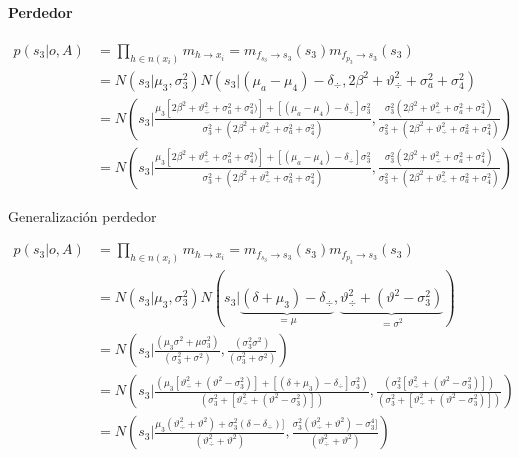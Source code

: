 \documentclass[11pt,twoside,spanish]{report} %
\begin{document}
\paragraph{Perdedor}
\begin{equation}
	\begin{split}
		p(s_3|o,A) &= \prod_{h \in n(x_i)} m_{h \rightarrow x_i} = m_{f_{s_3} \rightarrow s_3}(s_3) m_{f_{p_3} \rightarrow s_3}(s_3) \\
		&=  N(s_3| \mu_3, \sigma_3^2) N(s_3|(\mu_a - \mu_4) - \delta_{\div}, 2\beta^2+\vartheta_{\div}^2 + \sigma_a^2 + \sigma_4^2 )\\
		&= N\left(s_3\Big|  \frac{ \mu_3[2\beta^2+\vartheta_{\div}^2 + \sigma_a^2 + \sigma_4^2 )]+[(\mu_a - \mu_4) - \delta_{\div}]\sigma_3^2}{\sigma_3^2+( 2\beta^2+\vartheta_{\div}^2 + \sigma_a^2 + \sigma_4^2 )} , \frac{\sigma_3^2( 2\beta^2+\vartheta_{\div}^2 + \sigma_a^2 + \sigma_4^2 )}{\sigma_3^2+( 2\beta^2+\vartheta_{\div}^2 + \sigma_a^2 + \sigma_4^2 )} \right) \\
		&= N\left(s_3\Big|  \frac{ \mu_3[2\beta^2+\vartheta_{\div}^2 + \sigma_a^2 + \sigma_4^2 )]+[(\mu_a - \mu_4) - \delta_{\div}]\sigma_3^2}{\sigma_3^2+( 2\beta^2+\vartheta_{\div}^2 + \sigma_a^2 + \sigma_4^2 )} , \frac{\sigma_3^2( 2\beta^2+\vartheta_{\div}^2 + \sigma_a^2 + \sigma_4^2 )}{\sigma_3^2+( 2\beta^2+\vartheta_{\div}^2 + \sigma_a^2 + \sigma_4^2 )} \right)
	\end{split}
\end{equation}

Generalizaci\'on perdedor

\begin{equation}
	\begin{split}
		p(s_3|o,A) &= \prod_{h \in n(x_i)} m_{h \rightarrow x_i} = m_{f_{s_3} \rightarrow s_3}(s_3) m_{f_{p_3} \rightarrow s_3}(s_3) \\
		&=  N(s_3| \mu_3, \sigma_3^2) N( s_3|   \underbrace{(\delta + \mu_3) - \delta_{\div}}_{=\mu} , \underbrace{\vartheta_{\div}^2 + (\vartheta^2 - \sigma_3^2 )}_{=\sigma^2})\\
		&=  N\left(s_3\Big|\frac{(\mu_3\sigma^2+\mu\sigma_3^2)}{(\sigma_3^2+\sigma^2)}, \frac{(\sigma_3^2\sigma^2)}{(\sigma_3^2+\sigma^2)}\right)\\
		&=  N\left(s_3\Big|\frac{(\mu_3[\vartheta_{\div}^2 + (\vartheta^2 - \sigma_3^2 )]+[(\delta + \mu_3) - \delta_{\div}]\sigma_3^2)}{(\sigma_3^2+[\vartheta_{\div}^2 + (\vartheta^2 - \sigma_3^2 )])}, \frac{(\sigma_3^2[\vartheta_{\div}^2 + (\vartheta^2 - \sigma_3^2 )])}{(\sigma_3^2+[\vartheta_{\div}^2 + (\vartheta^2 - \sigma_3^2 )])}\right)\\
		&= N\left(s_3\Big| \frac{\mu_3 (\vartheta_{\div}^2 + \vartheta^2)+\sigma_3^2(\delta-\delta_{\div})]}{(\vartheta_{\div}^2 + \vartheta^2 )},\frac{\sigma_3^2(\vartheta_{\div}^2 + \vartheta^2) - \sigma_3^4 ]}{(\vartheta_{\div}^2 + \vartheta^2)}\right)
	\end{split}
\end{equation}
\end{document}
